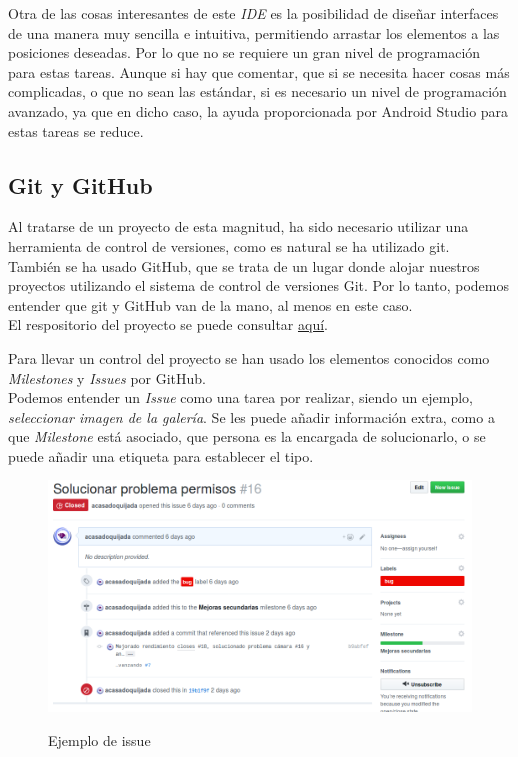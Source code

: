 Otra de las cosas interesantes de este \textit{IDE} es la posibilidad de diseñar interfaces de una manera muy sencilla e intuitiva, permitiendo arrastar los elementos a las posiciones deseadas. Por lo que no se requiere un gran nivel de programación para estas tareas. Aunque si hay que comentar, que si se necesita hacer cosas más complicadas, o que no sean las estándar, si es necesario un nivel de programación avanzado, ya que en dicho caso, la ayuda proporcionada por Android Studio para estas tareas se reduce.\\ 

\subsection{Git y GitHub}

Al tratarse de un proyecto de esta magnitud, ha sido necesario utilizar una herramienta de control de versiones, como es natural se ha utilizado git.\\

También se ha usado GitHub, que se trata de un lugar donde alojar nuestros proyectos utilizando el sistema de control de versiones Git. Por lo tanto, podemos entender que git y GitHub van de la mano, al menos en este caso.\\

El respositorio del proyecto se puede consultar \href{https://github.com/acasadoquijada/jmr-android}{aquí}.

Para llevar un control del proyecto se han usado los elementos conocidos como \textit{Milestones} y \textit{Issues} por GitHub.\\

Podemos entender un \textit{Issue} como una tarea por realizar, siendo un ejemplo, \textit{seleccionar imagen de la galería}. Se les puede añadir información extra, como a que \textit{Milestone} está asociado, que persona es la encargada de solucionarlo, o se puede añadir una etiqueta para establecer el tipo.\\

\begin{figure}[H] %
\centering
\includegraphics[scale=0.4]{imagenes/issue.png}  %
\label{issue.png}
\caption{Ejemplo de issue}
\end{figure}


